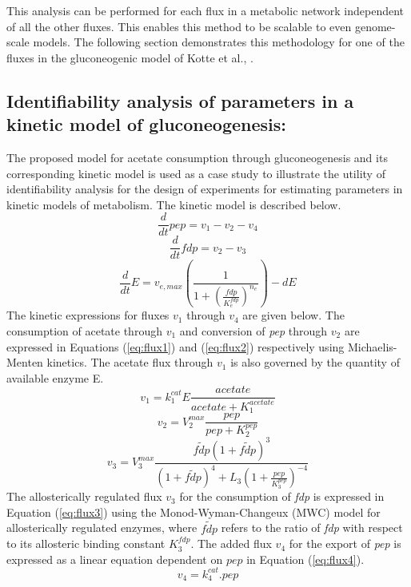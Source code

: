 \documentclass[10pt]{article}
\begin{document}
	This analysis can be performed for each flux in a metabolic network independent of all the other fluxes. This enables this method to be scalable to even genome-scale models. The following section demonstrates this methodology for one of the fluxes in the gluconeogenic model of Kotte et al., \parencite{Kotte2014}.
		
	\subsection{Identifiability analysis of parameters in a kinetic model of gluconeogenesis:}
	The proposed model for acetate consumption through gluconeogenesis and its corresponding kinetic model is used as a case study to illustrate the utility of identifiability analysis for the design of experiments for estimating parameters in kinetic models of metabolism. The kinetic model is described below.
	\begin{equation}\label{eq:ode1}
	\frac{d}{dt}pep=v_1-v_2-v_4
	\end{equation}
	\begin{equation}\label{eq:ode2}
	\frac{d}{dt}fdp=v_2-v_3
	\end{equation}
	\begin{equation}\label{eq:ode3}
	\frac{d}{dt}E=v_{e,max}\left(\frac{1}{1+\left(\frac{fdp}{K_{e}^{fdp}}\right)^{n_e}}\right) - d E
	\end{equation}
	The kinetic expressions for fluxes $v_1$ through $v_4$ are given below. The consumption of acetate through $v_1$ and conversion of \textit{pep} through $v_2$ are expressed in Equations (\ref{eq:flux1}) and (\ref{eq:flux2}) respectively using Michaelis-Menten kinetics. The acetate flux through $v_1$ is also governed by the quantity of available enzyme E. 
	\begin{equation}\label{eq:flux1}
	v_1 = k_{1}^{cat}E\frac{acetate}{acetate+K_{1}^{acetate}}
	\end{equation}	
	\begin{equation}\label{eq:flux2}
	v_2 = V_{2}^{max}\frac{pep}{pep+K_{2}^{pep}}
	\end{equation}
	\begin{equation}\label{eq:flux3}
	v_3 = V_{3}^{max}\frac{\tilde{fdp}\left(1+\tilde{fdp}\right)^3}{\left(1+\tilde{fdp}\right)^4+L_3\left(1+\frac{pep}{K_{3}^{pep}}\right)^{-4}}
	\end{equation}
	The allosterically regulated flux $v_3$ for the consumption of \textit{fdp} is expressed in Equation (\ref{eq:flux3}) using the Monod-Wyman-Changeux (MWC) model for allosterically regulated enzymes, where $\tilde{fdp}$ refers to the ratio of \textit{fdp} with respect to its allosteric binding constant $K_{3}^{fdp}$. The added flux $v_4$ for the export of \textit{pep} is expressed as a linear equation dependent on $pep$ in Equation (\ref{eq:flux4}).
	\begin{equation}\label{eq:flux4}
	v_4 = k_{4}^{cat}.pep
	\end{equation}
	
\end{document}
